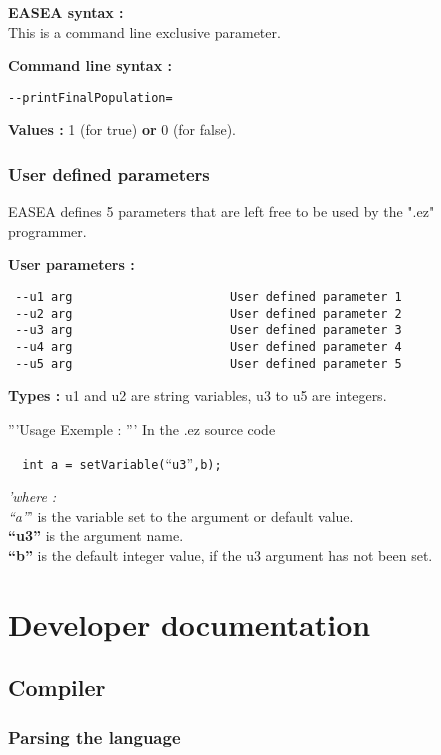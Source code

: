 \documentclass{book}
\begin{document}
\textbf{EASEA syntax :}\\This is a command line exclusive parameter.

\textbf{Command line syntax :}

\texttt{-{}-printFinalPopulation=}

\textbf{Values :} 1 (for true) \textbf{or} 0 (for false).

\subsection{User defined parameters}\label{user-defined-parameters}

EASEA defines 5 parameters that are left free to be used by the ".ez"
programmer.

\textbf{User parameters :}

\texttt{~-{}-u1~arg~~~~~~~~~~~~~~~~~~~~~~User~defined~parameter~1}\\\texttt{~-{}-u2~arg~~~~~~~~~~~~~~~~~~~~~~User~defined~parameter~2}\\\texttt{~-{}-u3~arg~~~~~~~~~~~~~~~~~~~~~~User~defined~parameter~3}\\\texttt{~-{}-u4~arg~~~~~~~~~~~~~~~~~~~~~~User~defined~parameter~4}\\\texttt{~-{}-u5~arg~~~~~~~~~~~~~~~~~~~~~~User~defined~parameter~5}

\textbf{Types :} u1 and u2 are string variables, u3 to u5 are integers.

'''Usage Exemple : ''' In the .ez source code

\texttt{~~int~a~=~setVariable(}``\texttt{u3}''\texttt{,b);}

\emph{'where : \textbf{\\}``a''}' is the variable set to the argument or
default value.\\\textbf{``u3''} is the argument name.\\\textbf{``b''} is
the default integer value, if the u3 argument has not been set.

\chapter{Developer documentation} %
\label{sec:Developer documentation}
\section{Compiler} %
\label{sub:Compiler}
   \subsection{Parsing the language} %
   \label{sub:subsection name}
\end{document}
